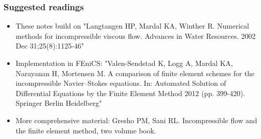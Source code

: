 \begin{frame}
\frametitle{Suggested readings}
\begin{itemize}
\item These notes build on "Langtangen HP, Mardal KA, Winther R. Numerical methods for incompressible viscous flow. Advances in Water Resources. 2002 Dec 31;25(8):1125-46" 
\item Implementation in FEniCS: "Valen-Sendstad K, Logg A, Mardal KA, Narayanan H, Mortensen M. A comparison of finite element schemes for the incompressible Navier–Stokes equations. In: Automated Solution of Differential Equations by the Finite Element Method 2012 (pp. 399-420). Springer Berlin Heidelberg"
\item More comprehensive material: Gresho PM, Sani RL. Incompressible flow and the finite element method, two volume book. 
\end{itemize}
\end{frame}
